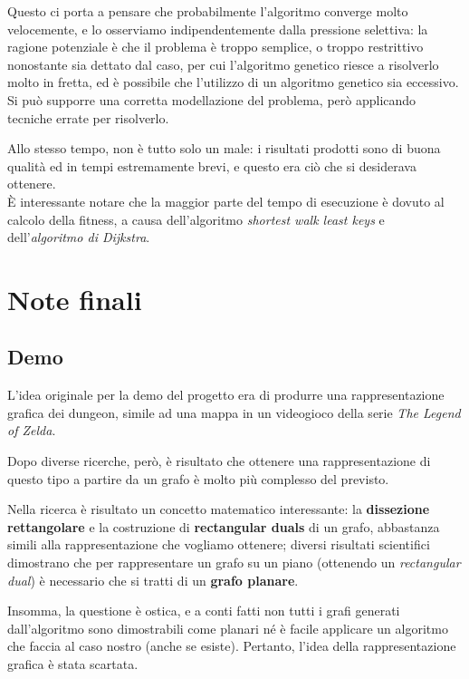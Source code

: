 \documentclass[12pt,titlepage]{article}
\begin{document}
\noindent Questo ci porta a pensare che probabilmente l'algoritmo converge molto velocemente, e lo osserviamo indipendentemente dalla pressione selettiva: la ragione potenziale è che il problema è troppo semplice, o troppo restrittivo nonostante sia dettato dal caso, per cui l'algoritmo genetico riesce a risolverlo molto in fretta, ed è possibile che l'utilizzo di un algoritmo genetico sia eccessivo. Si può supporre una corretta modellazione del problema, però applicando tecniche errate per risolverlo.

Allo stesso tempo, non è tutto solo un male: i risultati prodotti sono di buona qualità ed in tempi estremamente brevi, e questo era ciò che si desiderava ottenere.\\

\noindent È interessante notare che la maggior parte del tempo di esecuzione è dovuto al calcolo della fitness, a causa dell'algoritmo \textit{shortest walk least keys} e dell'\textit{algoritmo di Dijkstra}.

\section{Note finali}

\subsection {Demo}

L'idea originale per la demo del progetto era di produrre una rappresentazione grafica dei dungeon, simile ad una mappa in un videogioco della serie \textit{The Legend of Zelda}.

Dopo diverse ricerche, però, è risultato che ottenere una rappresentazione di questo tipo a partire da un grafo è molto più complesso del previsto.

Nella ricerca è risultato un concetto matematico interessante: la \textbf{dissezione rettangolare} e la costruzione di \textbf{rectangular duals} di un grafo, abbastanza simili alla rappresentazione che vogliamo ottenere; diversi risultati scientifici dimostrano che per rappresentare un grafo su un piano (ottenendo un \textit{rectangular dual}) è necessario che si tratti di un \textbf{grafo planare}.

Insomma, la questione è ostica, e a conti fatti non tutti i grafi generati dall'algoritmo sono dimostrabili come planari né è facile applicare un algoritmo che faccia al caso nostro (anche se esiste\cite{bhasker}). Pertanto, l'idea della rappresentazione grafica è stata scartata.\\
\end{document}
